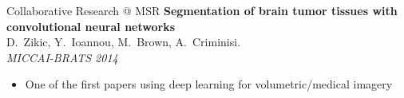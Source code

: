 \documentclass[t,xcolor=dvipsnames]{beamer}
\begin{document}

\begin{frame}{Collaborative Research @ MSR}
\textbf{Segmentation of brain tumor tissues with convolutional neural networks}\\{\footnotesize D.\ Zikic, Y.\ Ioannou, M.\ Brown, A.\ Criminisi.\\\textit{MICCAI-BRATS 2014}}
\begin{itemize}
    \item One of the first papers using deep learning for volumetric/medical imagery
\end{itemize}
\vfill
\end{frame}
\end{document}
